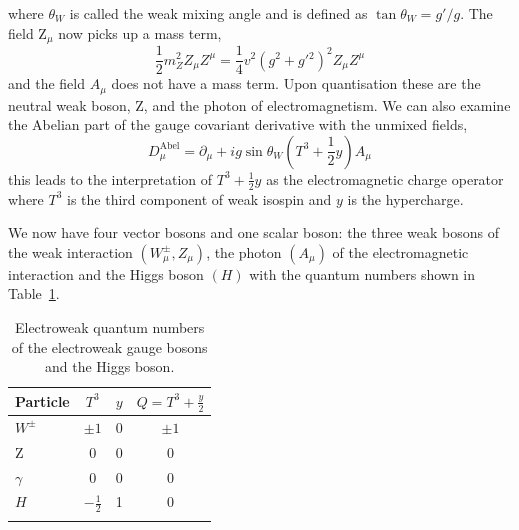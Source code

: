 where $\theta_{W}$ is called the weak mixing angle and is defined as $\tan{\theta_{W}} = g'/g$. The field $\mathrm{Z}_{\mu}$ now picks up a mass term,
\begin{equation}
    \frac{1}{2} m_{Z}^{2} Z_{\mu} Z^{\mu} = \frac{1}{4}v^{2}(g^{2}+g'{^2})^{2}Z_{\mu}Z^{\mu}
    \label{eq:theory:Z_mass}
\end{equation}
and the field $A_{\mu}$ does not have a mass term. Upon quantisation these are the neutral weak boson, Z, and the photon of electromagnetism.
We can also examine the Abelian part of the gauge covariant derivative with the unmixed fields, 
\begin{equation}
    D_{\mu}^{\mathrm{Abel}} = \partial_{\mu} + ig\sin{\theta_{W}}(T^{3} + \frac{1}{2}y)A_{\mu}
    \label{eq:theory:charge_operator}
\end{equation}
this leads to the interpretation of $T^{3} + \frac{1}{2}y$ as the electromagnetic charge operator where $T^{3}$ is the third component of weak isospin and $y$ is the hypercharge.


We now have four vector bosons and one scalar boson: the three weak bosons of the weak interaction $(W_{\mu}^{\pm},Z_{\mu})$, the photon $(A_{\mu})$ of the electromagnetic interaction and the Higgs boson $(H)$ with the quantum numbers shown in Table~\ref{tab:theory:elecroweak_qn_bosons}.
\begin{table}[h!]
    \centering
\renewcommand{\arraystretch}{1.3}
\begin{tabular}{ l | c c c }
    \thickhline
    Particle & $T^{3}$ & $y$ & $Q = T^3 + \frac{y}{2}$ \\
    \hline
    $W^{\pm}$  & $\pm{1}$ & 0 & $\pm1$ \\
    $\mathrm{Z}$    & 0 & 0 & 0 \\
    $\gamma$    & 0 & 0 & 0 \\
    $H$        & $-\frac{1}{2}$ & 1 & 0 \\
    \thickhline
\end{tabular}%
\caption{Electroweak quantum numbers of the electroweak gauge bosons and the Higgs boson.}
 \label{tab:theory:elecroweak_qn_bosons}
\end{table}

